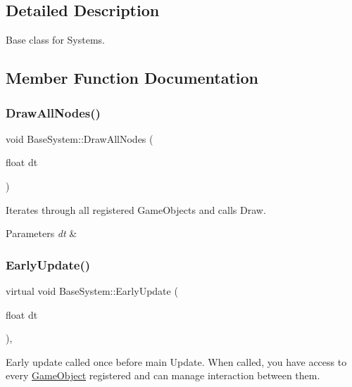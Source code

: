 \subsection{Detailed Description}
Base class for Systems. 

\subsection{Member Function Documentation}
\mbox{\label{classBaseSystem_af8f5ce5a033d06bd9aeb944d2a193e74}} 
\subsubsection{\texorpdfstring{Draw\+All\+Nodes()}{DrawAllNodes()}}
{\footnotesize\ttfamily void Base\+System\+::\+Draw\+All\+Nodes (\begin{DoxyParamCaption}\item[{float}]{dt }\end{DoxyParamCaption})}



Iterates through all registered Game\+Objects and calls Draw. 


\begin{DoxyParams}{Parameters}
{\em dt} & \\
\hline
\end{DoxyParams}
\mbox{\label{classBaseSystem_a202ed394e663f970f181d810c86760dc}} 
\subsubsection{\texorpdfstring{Early\+Update()}{EarlyUpdate()}}
{\footnotesize\ttfamily virtual void Base\+System\+::\+Early\+Update (\begin{DoxyParamCaption}\item[{float}]{dt }\end{DoxyParamCaption})\hspace{0.3cm}{\ttfamily [inline]}, {\ttfamily [virtual]}}



Early update called once before main Update. When called, you have access to every \hyperlink{classGameObject}{Game\+Object} registered and can manage interaction between them. 


